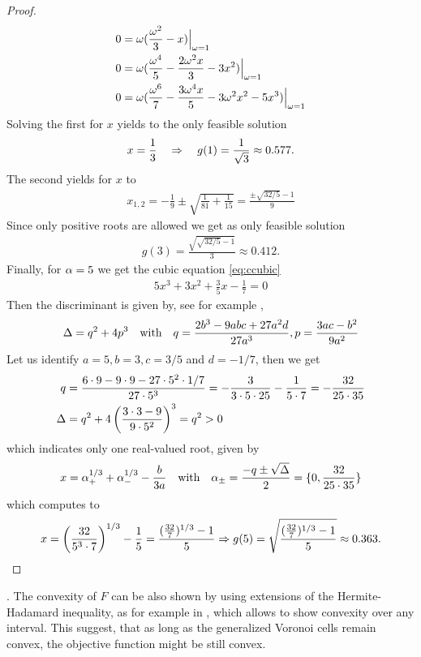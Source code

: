 \documentclass[smallabstract,smallcaptions]{dccpaper}
\newenvironment{remark}{\par\vspace{1.5ex}\noindent{\em Remark\/}.}{\par\vspace{1.5ex}}
\newcounter{example}[section]
\begin{document}
\begin{proof}
\begin{align}
  0 &= \omega(\frac{\omega^2}{3}-x)\Big|_{\omega=1}\\
  0 &= \omega(\frac{\omega^4}{5} -\frac{2\omega^2x}{3} - 3x^2)\Big|_{\omega=1}\\ 
  0 &= \omega(\frac{\omega^6}{7} -\frac{3\omega^4x}{5} - 3\omega^2x^2 -5x^3)\Big|_{\omega=1}\label{eq:ccubic} 
\end{align}
%
Solving the first for $x$  yields to the only feasible solution
%
\begin{align}
  x=\frac{1}{3} \quad\Rightarrow\quad g(1)=\frac{1}{\sqrt{3}}\approx 0.577.
\end{align}
%
The second yields for $x$ to 
%
\begin{align}
  x_{1,2}= -\frac{1}{9} \pm \sqrt{\frac{1}{81}+\frac{1}{15}} = \frac{\pm \sqrt{32/5} -1}{9}
\end{align}
%
Since only positive roots are allowed we get as only feasible solution
%
\begin{align}
  g(3)=\frac{\sqrt{\sqrt{32/5}-1}}{3}\approx 0.412.
\end{align}
%
Finally, for  $\alpha=5$ we get the cubic equation \eqref{eq:ccubic}
%
\begin{align}
  5x^3 + 3 x^2 + \frac{3}{5} x - \frac{1}{7}=0
\end{align}
%
Then the discriminant is given by, see for example \cite[2.3.2]{Zwi03},
%
\begin{align}
  \Delta=q^2+4p^3 \quad\text{with}\quad q=\frac{2b^3-9abc+27a^2d}{27a^3},p=\frac{3ac-b^2}{9a^2}
\end{align}
%
Let us identify $a=5,b=3,c=3/5$ and $d=-1/7$, then we get
%
\begin{align}
  q&=\frac{6\cdot 9-9\cdot 9 - 27\cdot 5^2\cdot1/7}{27\cdot 5^3}
  =-\frac{3}{3\cdot 5\cdot 25} -\frac{1}{5\cdot 7}=-\frac{32}{25\cdot35}\\
  \Delta&=q^2 + 4 \left(\frac{3\cdot 3 -9}{9\cdot 5^2}\right)^3=q^2>0
\end{align}
%
which indicates only one real-valued root, given by
%
\begin{align}
  x=\alpha_+^{1/3}+\alpha_-^{1/3}-\frac{b}{3a} 
  \quad\text{with}\quad  \alpha_{\pm}=\frac{-q\pm\sqrt{\Delta}}{2} = \{0, \frac{32}{25\cdot 35} \}
\end{align}
%
which computes to
%
\begin{align}
  x=\left( \frac{32}{5^3\cdot 7}\right)^{1/3}- \frac{1}{5}
  =\frac{(\frac{32}{7})^{1/3}-1}{5} \Rightarrow g(5)=\sqrt{\frac{(\frac{32}{7})^{1/3}-1}{5}} \approx 0.363.
\end{align}
\fi %
\end{proof}    
%
\begin{remark}
  The convexity of $F$ can be also shown by using extensions of the Hermite-Hadamard inequality, as for example in
  \cite{ZC10}, which allows to show convexity over any interval. This suggest, that as long as the generalized Voronoi cells remain
  convex, the objective function might be still convex.  
\end{remark}
\end{document}
